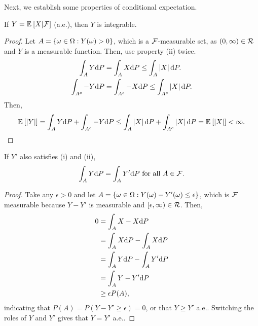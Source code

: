Next, we establish some properties of conditional expectation.

\begin{lem}[Integrability]
    If $Y = {\mathbb E}_{}\left[X | \mathcal{F}\right]$ (a.e.), then $Y$ is integrable.
\end{lem}
\begin{proof}
    Let $A = \left\{\omega \in \Omega: Y(\omega) > 0\right\}$, which is a $\mathcal{F}$-measurable set, as $(0, \infty) \in \mathcal{R}$ and $Y$ is a measurable function. Then, use property (ii) twice.
    \begin{align*}
        \int_A Y \text{d} P &= \int_A X \text{d} P \leq \int_A \left|X\right| \text{d} P.\\
        \int_{A^c} -Y \text{d} P &= \int_{A^c} -X \text{d} P \leq \int_{A^c} \left|X\right| \text{d} P.
    \end{align*} 
    Then,
    \begin{align*}
        {\mathbb E}_{}\left[\left|Y\right|\right] = \int_A Y \text{d} P + \int_{A^c} -Y \text{d} P \leq \int_A \left|X\right| \text{d} P + \int_{A^c} \left|X\right| \text{d} P = {\mathbb E}_{}\left[\left|X\right|\right] < \infty.
    \end{align*}
\end{proof}

\begin{lem}[Uniqueness]
    If $Y'$ also satisfies (i) and (ii),
    \begin{align*}
        \int_A Y \text{d} P = \int_A Y' \text{d} P \text{ for all } A \in \mathcal{F}.
    \end{align*}
\end{lem}
\begin{proof}
    Take any $\epsilon > 0$ and let $A = \left\{\omega \in \Omega: Y(\omega) - Y'(\omega) \leq \epsilon\right\}$, which is $\mathcal{F}$ measurable because $Y - Y'$ is measurable and $[\epsilon, \infty) \in \mathcal{R}$. Then,
    \begin{align*}
        0 &= \int_A X - X \text{d} P\\
        &= \int_A X \text{d} P - \int_A X \text{d} P\\
        &= \int_A Y \text{d} P - \int_A Y' \text{d} P\\
        &= \int_A Y -Y' \text{d} P\\
        &\geq \epsilon P(A),
    \end{align*}
    indicating that $P(A) = P(Y - Y' \geq \epsilon) = 0$, or that $Y \geq Y'$ a.e.. Switching the roles of $Y$ and $Y'$ gives that $Y = Y'$ a.e.. 
\end{proof}

